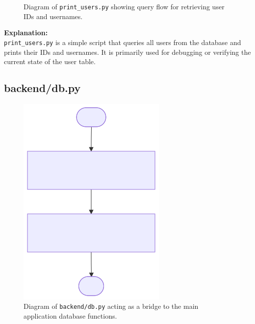 \documentclass{report}
\begin{document}
\begin{figure}[h]
    \caption{Diagram of \texttt{print\_users.py} showing query flow for retrieving user IDs and usernames.}
\end{figure}

\noindent
\textbf{Explanation:} \\
\texttt{print\_users.py} is a simple script that queries all users from the database and prints their IDs and usernames. It is primarily used for debugging or verifying the current state of the user table.

\subsection{backend/db.py}

\begin{figure}[h]
    \centering
    \includegraphics[width=\textwidth]{png_files/db_module_flow.png}
    \caption{Diagram of \texttt{backend/db.py} acting as a bridge to the main application database functions.}
\end{figure}
\end{document}
